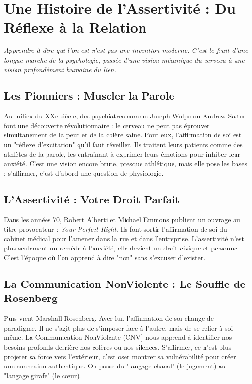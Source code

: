 \chapter{Une Histoire de l'Assertivité : Du Réflexe à la Relation}

\textit{Apprendre à dire qui l'on est n'est pas une invention moderne. C'est le fruit d'une longue marche de la psychologie, passée d'une vision mécanique du cerveau à une vision profondément humaine du lien.}

\section{Les Pionniers : Muscler la Parole}
Au milieu du XXe siècle, des psychiatres comme Joseph Wolpe ou Andrew Salter font une découverte révolutionnaire : le cerveau ne peut pas éprouver simultanément de la peur et de la colère saine. Pour eux, l'affirmation de soi est un "réflexe d'excitation" qu'il faut réveiller. Ils traitent leurs patients comme des athlètes de la parole, les entraînant à exprimer leurs émotions pour inhiber leur anxiété. C'est une vision encore brute, presque athlétique, mais elle pose les bases : s'affirmer, c'est d'abord une question de physiologie.

\section{L'Assertivité : Votre Droit Parfait}
Dans les années 70, Robert Alberti et Michael Emmons publient un ouvrage au titre provocateur : \textit{Your Perfect Right}. Ils font sortir l'affirmation de soi du cabinet médical pour l'amener dans la rue et dans l'entreprise. L'assertivité n'est plus seulement un remède à l'anxiété, elle devient un droit civique et personnel. C'est l'époque où l'on apprend à dire "non" sans s'excuser d'exister.

\section{La Communication NonViolente : Le Souffle de Rosenberg}
Puis vient Marshall Rosenberg. Avec lui, l'affirmation de soi change de paradigme. Il ne s'agit plus de s'imposer face à l'autre, mais de se relier à soi-même. La Communication NonViolente (CNV) nous apprend à identifier nos besoins profonds derrière nos colères ou nos silences. S'affirmer, ce n'est plus projeter sa force vers l'extérieur, c'est oser montrer sa vulnérabilité pour créer une connexion authentique. On passe du "langage chacal" (le jugement) au "langage girafe" (le cœur).

